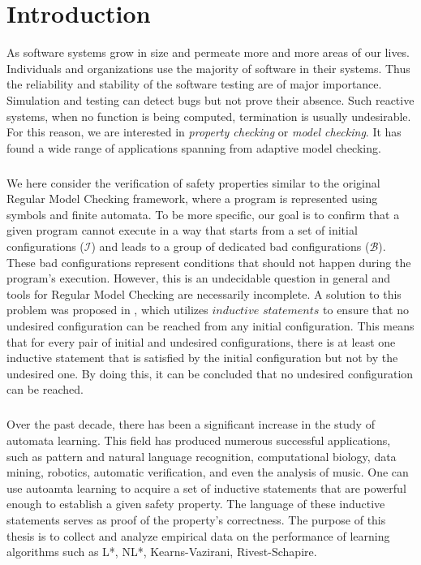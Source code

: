 
\chapter{Introduction}\label{chapter:introduction}
As software systems grow in size and permeate more and more areas of our lives.
Individuals and organizations use the majority of software in their systems. Thus the 
reliability and stability of the software testing are of major importance. Simulation 
and testing can detect bugs but not prove their absence. Such reactive 
systems, when no function is being computed, termination is usually undesirable. For 
this reason, we are interested in \textit{property checking} or \textit{model checking}. 
It has found a wide range of applications spanning from adaptive model checking.
\paragraph*{}
We here consider the verification of safety properties similar to the original 
Regular Model Checking framework, where a program is represented using symbols 
and finite automata.
To be more specific, our goal is to confirm that a given program cannot execute 
in a way that starts from a set of initial configurations ($\mathcal{I}$) and leads to a group 
of dedicated bad configurations ($\mathcal{B}$). These bad configurations represent conditions 
that should not happen during the program's execution. However, this is an 
undecidable question in general and tools for Regular Model Checking are 
necessarily incomplete. 
A solution to this problem was proposed in \cite*{clarke2009model}, which utilizes 
$\textit{inductive statements}$ to ensure that no undesired configuration can be reached 
from any initial configuration. This means that for every pair of initial 
and undesired configurations, there is at least one inductive statement that 
is satisfied by the initial configuration but not by the undesired one. 
By doing this, it can be concluded that no undesired configuration can be reached.
\paragraph*{}
Over the past decade, there has been a significant increase in the study of automata learning.
This field has produced numerous successful applications, such as pattern and natural language recognition, 
computational biology, data mining, robotics, automatic verification, and even the analysis of music.
One can use autoamta learning to acquire a set of inductive statements that 
are powerful enough to establish a given safety property. The language of these
inductive statements serves as proof of the property's correctness.
The purpose of this thesis is to collect and analyze empirical data on 
the performance of learning algorithms such as L*, NL*, Kearns-Vazirani, Rivest-Schapire.


